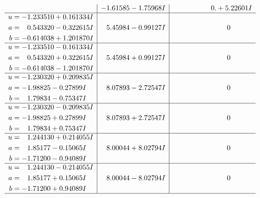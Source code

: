 \documentclass[1p]{elsarticle_modified}
\theoremstyle{definition}
\begin{document}
$$\begin{array}{c|c|c}
 & -1.61585 - 1.75968 I & \phantom{-0.000000 -}0. + 5.22601 I \\ \hline\begin{aligned}
u &= -1.233510 + 0.161334 I \\
a &= \phantom{-}0.543320 - 0.322615 I \\
b &= -0.614038 + 1.201870 I\end{aligned}
 & \phantom{-}5.45984 - 0.99127 I & \phantom{-0.000000 } 0 \\ \hline\begin{aligned}
u &= -1.233510 - 0.161334 I \\
a &= \phantom{-}0.543320 + 0.322615 I \\
b &= -0.614038 - 1.201870 I\end{aligned}
 & \phantom{-}5.45984 + 0.99127 I & \phantom{-0.000000 } 0 \\ \hline\begin{aligned}
u &= -1.230320 + 0.209835 I \\
a &= -1.98825 - 0.27899 I \\
b &= \phantom{-}1.79834 - 0.75347 I\end{aligned}
 & \phantom{-}8.07893 - 2.72547 I & \phantom{-0.000000 } 0 \\ \hline\begin{aligned}
u &= -1.230320 - 0.209835 I \\
a &= -1.98825 + 0.27899 I \\
b &= \phantom{-}1.79834 + 0.75347 I\end{aligned}
 & \phantom{-}8.07893 + 2.72547 I & \phantom{-0.000000 } 0 \\ \hline\begin{aligned}
u &= \phantom{-}1.244130 + 0.214055 I \\
a &= \phantom{-}1.85177 - 0.15065 I \\
b &= -1.71200 - 0.94089 I\end{aligned}
 & \phantom{-}8.00044 + 8.02794 I & \phantom{-0.000000 } 0 \\ \hline\begin{aligned}
u &= \phantom{-}1.244130 - 0.214055 I \\
a &= \phantom{-}1.85177 + 0.15065 I \\
b &= -1.71200 + 0.94089 I\end{aligned}
 & \phantom{-}8.00044 - 8.02794 I & \phantom{-0.000000 } 0\\
 \hline 
 \end{array}$$\newpage$$\begin{array}{c|c|c}  

\end{array}$$
\end{document}
